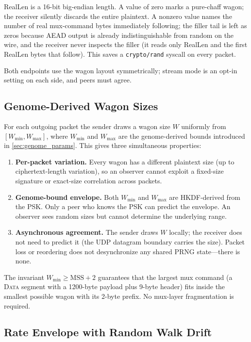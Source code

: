 \documentclass[11pt,a4paper]{article}
\begin{document}
\textsf{RealLen} is a 16-bit big-endian length. A value of zero marks a pure-chaff wagon; the receiver silently discards the entire plaintext. A nonzero value names the number of real mux-command bytes immediately following; the filler tail is left as zeros because AEAD output is already indistinguishable from random on the wire, and the receiver never inspects the filler (it reads only \textsf{RealLen} and the first \textsf{RealLen} bytes that follow). This saves a \texttt{crypto/rand} syscall on every packet.

Both endpoints use the wagon layout symmetrically; stream mode is an opt-in setting on each side, and peers must agree.

\subsection{Genome-Derived Wagon Sizes}\label{sec:wagon_sizes}

For each outgoing packet the sender draws a wagon size $W$ uniformly from $[W_{\min}, W_{\max}]$, where $W_{\min}$ and $W_{\max}$ are the genome-derived bounds introduced in \cref{sec:genome_params}. This gives three simultaneous properties:

\begin{enumerate}[nosep]
  \item \textbf{Per-packet variation.} Every wagon has a different plaintext size (up to ciphertext-length variation), so an observer cannot exploit a fixed-size signature or exact-size correlation across packets.
  \item \textbf{Genome-bound envelope.} Both $W_{\min}$ and $W_{\max}$ are HKDF-derived from the PSK. Only a peer who knows the PSK can predict the envelope. An observer sees random sizes but cannot determine the underlying range.
  \item \textbf{Asynchronous agreement.} The sender draws $W$ locally; the receiver does not need to predict it (the UDP datagram boundary carries the size). Packet loss or reordering does not desynchronize any shared PRNG state---there is none.
\end{enumerate}

The invariant $W_{\min} \geq \text{MSS} + 2$ guarantees that the largest mux command (a \textsc{Data} segment with a 1200-byte payload plus 9-byte header) fits inside the smallest possible wagon with its 2-byte prefix. No mux-layer fragmentation is required.

\subsection{Rate Envelope with Random Walk Drift}\label{sec:rate_envelope}
\end{document}
